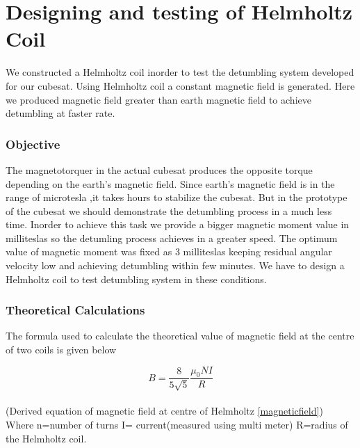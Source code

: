 \chapter{Designing and testing of Helmholtz Coil}


We constructed a Helmholtz coil inorder to test the detumbling system developed for our cubesat. Using Helmholtz coil a constant magnetic field is generated. Here we produced magnetic field greater than earth magnetic field to achieve detumbling at faster rate.

\subsection{Objective}

The magnetotorquer in the actual cubesat produces the opposite torque depending on the earth's magnetic field. Since earth's magnetic field is in the range of microtesla ,it takes hours to stabilize the cubesat. But in the prototype of the cubesat we should demonstrate the detumbling process in a much less time. Inorder to achieve this task we provide a bigger magnetic moment value in milliteslas so the detumling process achieves in a greater speed. The optimum value of magnetic moment was fixed as 3 milliteslas keeping residual angular velocity low and achieving detumbling within few minutes. We have to design a Helmholtz coil to test detumbling system in these conditions.
\subsection{Theoretical Calculations}
\par The formula used to calculate the theoretical value of magnetic field at the centre of two coils is given below

$$ B= \frac{8}{5\sqrt{5}}\frac{\mu_0 NI}{R}$$\\
\hspace{100pt} (Derived equation of magnetic field at centre of Helmholtz \ref{magneticfield})\\

Where n=number of turns
            I= current(measured using multi meter)
            R=radius of the Helmholtz coil.
\vspace{10pt}  

